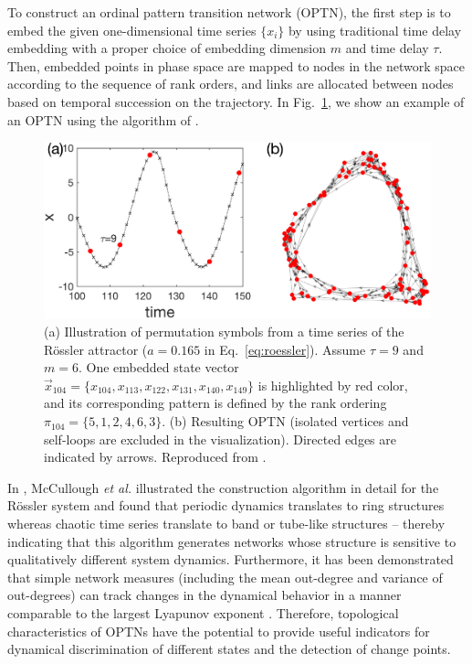 		To construct an ordinal pattern transition network (OPTN), the first step is to embed the given one-dimensional time series $\{x_i\}$ by using traditional time delay embedding with a proper choice of embedding dimension $m$ and time delay $\tau$. Then, embedded points in phase space are mapped to nodes in the network space according to the sequence of rank orders, and links are allocated between nodes based on temporal succession on the trajectory. In Fig.~\ref{fig:rosTNm}, we show an example of an OPTN using the algorithm of \cite{McCullough2015}. 
\begin{figure}[ht]
	\centering
	\includegraphics[width=\columnwidth]{Chapter05_TransitionNt/rosslerOPexample.eps}
\caption{(a) Illustration of permutation symbols from a time series of the R\"ossler attractor ($a = 0.165$ in Eq.~\eqref{eq:roessler}). Assume $\tau = 9$ and $m = 6$. One embedded state vector $\vec{x}_{104} = \{x_{104}, x_{113}, x_{122}, x_{131}, x_{140}, x_{149} \}$ is highlighted by red color, and its corresponding pattern is defined by the rank ordering $\pi_{104} = \{5, 1, 2, 4, 6, 3\}$. (b) Resulting OPTN (isolated vertices and self-loops are excluded in the visualization). Directed edges are indicated by arrows. Reproduced from \cite{McCullough2015}. \label{fig:rosTNm}}
\end{figure}
		
		In \cite{McCullough2015}, McCullough {\textit{et al.}} illustrated the construction algorithm in detail for the R\"ossler system and found that periodic dynamics translates to ring structures whereas chaotic time series translate to band or tube-like structures -- thereby indicating that this algorithm generates networks whose structure is sensitive to qualitatively different system dynamics. Furthermore, it has been demonstrated that simple network measures (including the mean out-degree and variance of out-degrees) can track changes in the dynamical behavior in a manner comparable to the largest Lyapunov exponent \cite{McCullough2015}. Therefore, topological characteristics of OPTNs have the potential to provide useful indicators for dynamical discrimination of different states and the detection of change points. 
		
